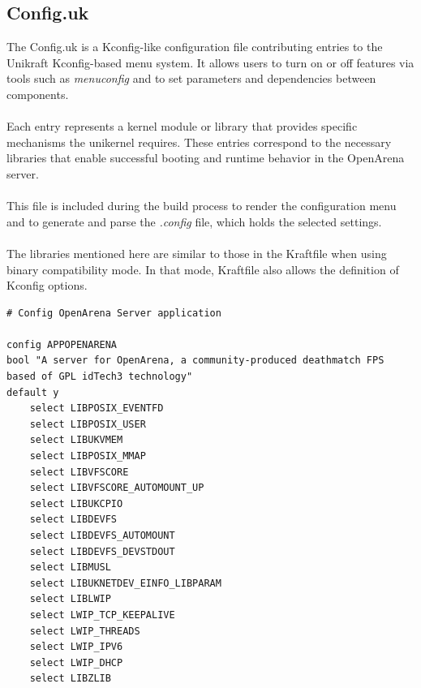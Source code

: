 \subsection{Config.uk}
The Config.uk is a Kconfig-like configuration file contributing entries to the Unikraft Kconfig-based menu system.
It allows users to turn on or off features via tools such as \textit{menuconfig} and to set parameters and dependencies
between components. \\ \\
Each entry represents a kernel module or library that provides specific mechanisms the unikernel requires.
These entries correspond to the necessary libraries that enable successful booting and runtime behavior in the OpenArena server. \\ \\
This file is included during the build process to render the configuration menu and to generate and parse the \textit{.config} file, which holds the
selected settings. \\ \\
The libraries mentioned here are similar to those in the Kraftfile when using binary compatibility mode. In that mode, Kraftfile also allows the definition
of Kconfig options.
\\
\lstset{basicstyle=\small\ttfamily, caption=Config.uk, language=C, showstringspaces=false, keepspaces=true}
\begin{lstlisting}
# Config OpenArena Server application

config APPOPENARENA
bool "A server for OpenArena, a community-produced deathmatch FPS based of GPL idTech3 technology"
default y
    select LIBPOSIX_EVENTFD
    select LIBPOSIX_USER
    select LIBUKVMEM
    select LIBPOSIX_MMAP
    select LIBVFSCORE
    select LIBVFSCORE_AUTOMOUNT_UP
    select LIBUKCPIO
    select LIBDEVFS
    select LIBDEVFS_AUTOMOUNT
    select LIBDEVFS_DEVSTDOUT
    select LIBMUSL
    select LIBUKNETDEV_EINFO_LIBPARAM
    select LIBLWIP
    select LWIP_TCP_KEEPALIVE
    select LWIP_THREADS
    select LWIP_IPV6
    select LWIP_DHCP
    select LIBZLIB
\end{lstlisting}
\\
